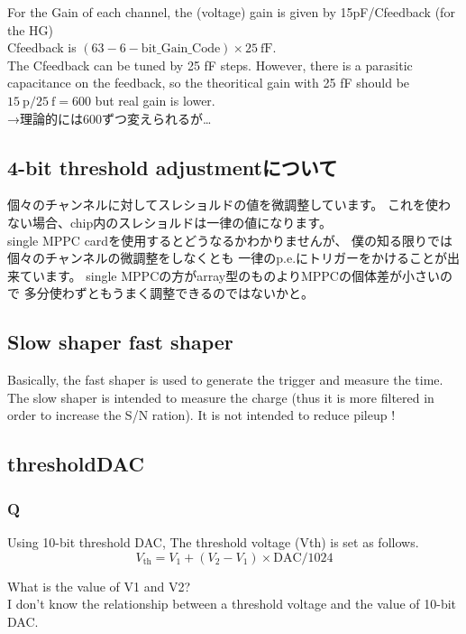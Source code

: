 For the Gain of each channel, the (voltage) gain is given by 15pF/Cfeedback (for the HG)\\
Cfeedback is $(63 - 6-\mathrm{bit\_Gain\_Code}) \times 25\ \mathrm{fF}$.\\
The Cfeedback can be tuned by 25 fF steps. However, there is a parasitic capacitance on the feedback, so the theoritical gain with 25 fF should be $15\ \mathrm{p} / 25\ \mathrm{f} = 600$ but real gain is lower. \\
→理論的には600ずつ変えられるが…


\subsection{4-bit threshold adjustmentについて}

個々のチャンネルに対してスレショルドの値を微調整しています。
これを使わない場合、chip内のスレショルドは一律の値になります。\\
single MPPC cardを使用するとどうなるかわかりませんが、
僕の知る限りでは個々のチャンネルの微調整をしなくとも
一律のp.e.にトリガーをかけることが出来ています。
single MPPCの方がarray型のものよりMPPCの個体差が小さいので
多分使わずともうまく調整できるのではないかと。

\subsection{Slow shaper fast shaper}

Basically, the fast shaper is used to generate the trigger and measure the time.\\
The slow shaper is intended to measure the charge (thus it is more filtered in order to increase the S/N ration). It is not intended to reduce pileup !


\subsection{thresholdDAC}
\subsubsection*{Q} 
Using 10-bit threshold DAC, The threshold voltage (Vth) is set as follows.
\[ V_{\mathrm{th}} = V_1 + (V_2 - V_1) \times \mathrm{DAC} /1024 \]

What is the value of V1 and V2?\\
I don't know the relationship between a threshold voltage and the value of 10-bit DAC.\\

